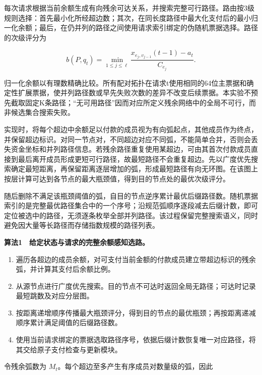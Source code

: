 \documentclass[UTF8,a4paper,twocolumn,fontset=none,zihao=5]{ctexart}
\newcommand{\algtitle}[1]{\par\Needspace{6\baselineskip}\smallskip\noindent\textbf{#1}\par\smallskip}
\begin{document}
每次请求根据当前余额生成有向残余可达关系，并搜索完整可行路径。路由按3级规则选择：首先最小化所经超边数；其次，在同长度路径中最大化支付后的最小归一化余额；最后，在仍并列的路径之间使用请求索引绑定的伪随机票据选择。路径的次级评分为



\begin{equation}
b(P,q_t)=\min_{1\leq j\leq\ell}\frac{x_{e_j,v_{j-1}}(t-1)-a_t}{C_{e_j}}.
\label{eq:6}\end{equation}


归一化余额以有理数精确比较。所有配对拓扑在请求t使用相同的64位主票据和确定性扩展票据，使并列路径数或早先失败次数的差异不改变后续票据。本实验不预先截取固定K条路径；“无可用路径”因而对应所定义残余网络中的全局不可行，而非候选集合搜索失败。


实现时，将每个超边中余额足以付款的成员视为有向弧起点，其他成员作为终点，并保留超边标识。对同一节点对，不同超边对应不同弧，不能简单合并，否则会丢失资金坐标和并列路径信息。若残余路径重复使用某超边，可由其首次付款成员直接到最后离开成员形成更短可行路径，故最短路径不会重复超边。先以广度优先搜索确定最短距离，再保留距离逐层增加的弧，形成最短路径有向无环图。在该图上按层计算可达到各节点的最大瓶颈值，得到目的节点处的最优次级评分。


随后删除不满足该瓶颈阈值的弧，自目的节点逆序累计最优后缀路径数。随机票据索引的是完整最优路径集合中的一个序号；沿规范弧顺序逐段减去后缀计数，即可定位被选中的路径，无须逐条枚举全部并列路径。该过程保留完整搜索语义，同时避免因大量等长路径而存储指数规模的路径列表。


\algtitle{算法1　给定状态与请求的完整余额感知选路。}\begin{enumerate}

\item 遍历各超边的成员余额，对可支付当前金额的付款成员建立带超边标识的残余弧，并计算其支付后余额比例。

\item 从源节点进行广度优先搜索。目的节点不可达时返回全局无路径；可达时记录最短跳数及对应分层图。

\item 按距离递增顺序传播最大瓶颈评分，得到目的节点的最优瓶颈；再按距离递减顺序累计满足阈值的后缀路径数。

\item 使用当前请求绑定的票据选取路径序号，依据后缀计数恢复唯一对应路径，将其交给原子支付检查与更新模块。

\end{enumerate}

令残余弧数为 $M_t$。每个超边至多产生有序成员对数量级的弧，因此
\end{document}
